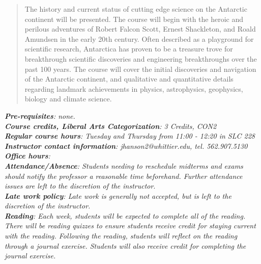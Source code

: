 \documentclass[10pt]{article}
\begin{document}
\maketitle

\begin{abstract}
The history and current status of cutting edge science on the Antarctic continent will be presented. The course will begin with the heroic and perilous adventures of Robert Falcon Scott, Ernest Shackleton, and Roald Amundsen in the early 20th century. Often described as a playground for scientific research, Antarctica has proven to be a treasure trove for breakthrough scientific discoveries and engineering breakthroughs over the past 100 years. The course will cover the initial discoveries and navigation of the Antarctic continent, and qualitative and quantitative details regarding landmark achievements in physics, astrophysics, geophysics, biology and climate science.
\end{abstract}
\noindent
\textit{\textbf{Pre-requisites}: none.} \\
\textit{\textbf{Course credits, Liberal Arts Categorization}: 3 Credits, CON2} \\
\textit{\textbf{Regular course hours}: Tuesday and Thursday from 11:00 - 12:20 in SLC 228} \\
\textit{\textbf{Instructor contact information}: jhanson2@whittier.edu, tel. 562.907.5130} \\
\textit{\textbf{Office hours}: } \\
\textit{\textbf{Attendance/Absence}: Students needing to reschedule midterms and exams should notify the professor a reasonable time beforehand. Further attendance issues are left to the discretion of the instructor}.\\ 
\textit{\textbf{Late work policy}: Late work is generally not accepted, but is left to the discretion of the instructor.} \\
\textit{\textbf{Reading}: Each week, students will be expected to complete all of the reading.  There will be reading quizzes to ensure students receive credit for staying current with the reading.  Following the reading, students will reflect on the reading through a journal exercise.  Students will also receive credit for completing the journal exercise.}
\end{document}
